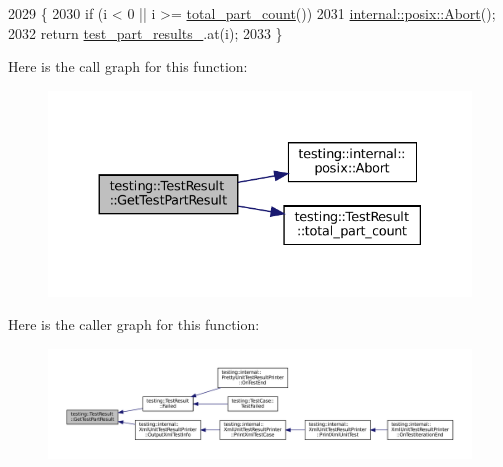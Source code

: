 \begin{DoxyCode}
2029                                                                \{
2030   \textcolor{keywordflow}{if} (i < 0 || i >= \hyperlink{classtesting_1_1TestResult_a6174aa4019dcda7c34d776b5741c9032}{total\_part\_count}())
2031     \hyperlink{namespacetesting_1_1internal_1_1posix_a69b8278c59359dd6a6f941b4643db9fb}{internal::posix::Abort}();
2032   \textcolor{keywordflow}{return} \hyperlink{classtesting_1_1TestResult_af17c00fae1435d344b318eb6bbb56cff}{test\_part\_results\_}.at(i);
2033 \}
\end{DoxyCode}
Here is the call graph for this function\+:
\nopagebreak
\begin{figure}[H]
\begin{center}
\leavevmode
\includegraphics[width=330pt]{classtesting_1_1TestResult_a765c1e734ac08115757b343d57226bba_cgraph}
\end{center}
\end{figure}
Here is the caller graph for this function\+:
\nopagebreak
\begin{figure}[H]
\begin{center}
\leavevmode
\includegraphics[width=350pt]{classtesting_1_1TestResult_a765c1e734ac08115757b343d57226bba_icgraph}
\end{center}
\end{figure}
\mbox{\label{classtesting_1_1TestResult_a6c2f478dbce36b57d18bedded46d70af}} 
